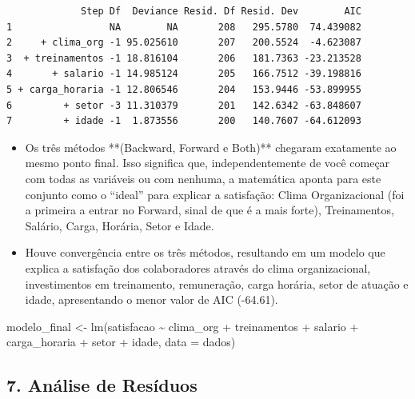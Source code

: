 \documentclass[
  letterpaper,
  DIV=11,
  numbers=noendperiod]{scrartcl}
\newenvironment{Shaded}{\begin{snugshade}}{\end{snugshade}}
\newcommand{\AttributeTok}[1]{\textcolor[rgb]{0.40,0.45,0.13}{#1}}
\newcommand{\FunctionTok}[1]{\textcolor[rgb]{0.28,0.35,0.67}{#1}}
\newcommand{\NormalTok}[1]{\textcolor[rgb]{0.00,0.23,0.31}{#1}}
\newcommand{\OtherTok}[1]{\textcolor[rgb]{0.00,0.23,0.31}{#1}}
\newcommand{\SpecialCharTok}[1]{\textcolor[rgb]{0.37,0.37,0.37}{#1}}
\begin{document}
\begin{Shaded}
\end{Shaded}

\begin{verbatim}
             Step Df  Deviance Resid. Df Resid. Dev        AIC
1                 NA        NA       208   295.5780  74.439082
2     + clima_org -1 95.025610       207   200.5524  -4.623087
3  + treinamentos -1 18.816104       206   181.7363 -23.213528
4       + salario -1 14.985124       205   166.7512 -39.198816
5 + carga_horaria -1 12.806546       204   153.9446 -53.899955
6         + setor -3 11.310379       201   142.6342 -63.848607
7         + idade -1  1.873556       200   140.7607 -64.612093
\end{verbatim}

\begin{itemize}
\item
  Os três métodos **(Backward, Forward e Both)** chegaram exatamente ao
  mesmo ponto final. Isso significa que, independentemente de você
  começar com todas as variáveis ou com nenhuma, a matemática aponta
  para este conjunto como o ``ideal'' para explicar a satisfação: Clima
  Organizacional (foi a primeira a entrar no Forward, sinal de que é a
  mais forte), Treinamentos, Salário, Carga, Horária, Setor e Idade.
\item
  Houve convergência entre os três métodos, resultando em um modelo que
  explica a satisfação dos colaboradores através do clima
  organizacional, investimentos em treinamento, remuneração, carga
  horária, setor de atuação e idade, apresentando o menor valor de AIC
  (-64.61).
\end{itemize}

\begin{Shaded}
\begin{Highlighting}[]
\NormalTok{modelo\_final }\OtherTok{\textless{}{-}} \FunctionTok{lm}\NormalTok{(satisfacao }\SpecialCharTok{\textasciitilde{}}\NormalTok{ clima\_org }\SpecialCharTok{+}\NormalTok{ treinamentos }\SpecialCharTok{+}\NormalTok{ salario  }\SpecialCharTok{+}\NormalTok{ carga\_horaria }\SpecialCharTok{+}\NormalTok{ setor }\SpecialCharTok{+}\NormalTok{ idade, }\AttributeTok{data =}\NormalTok{ dados)}
\end{Highlighting}
\end{Shaded}

\subsection{7. Análise de Resíduos}\label{anuxe1lise-de-resuxedduos}
\end{document}
